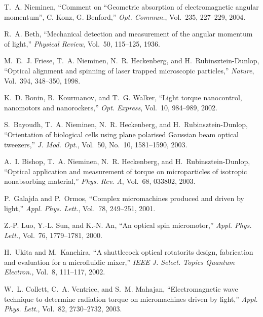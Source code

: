 \documentclass{article}
\begin{document}
\begin{thebibliography}{99}
T.~A. Nieminen, ``Comment on ``{G}eometric absorption of electromagnetic
  angular momentum'', {C}. {K}onz, {G}. {B}enford,'' {\em Opt. Commun.},
  Vol.~235, 227--229, 2004.

R.~A. Beth, ``Mechanical detection and measurement of the angular momentum of
  light,'' {\em Physical Review}, Vol.~50, 115--125, 1936.

M.~E.~J. Friese, T.~A. Nieminen, N.~R. Heckenberg, and H.~Rubinsztein-Dunlop,
  ``Optical alignment and spinning of laser trapped microscopic particles,''
  {\em Nature}, Vol.~394, 348--350, 1998.


K.~D. Bonin, B.~Kourmanov, and T.~G. Walker, ``Light torque nanocontrol,
  nanomotors and nanorockers,'' {\em Opt. Express}, Vol.~10, 984--989,
  2002.

S.~Bayoudh, T.~A. Nieminen, N.~R. Heckenberg, and H.~Rubinsztein-Dunlop,
  ``Orientation of biological cells using plane polarised {G}aussian beam
  optical tweezers,'' {\em J. Mod. Opt.}, Vol.~50, No.~10,
  1581--1590, 2003.

A.~I. Bishop, T.~A. Nieminen, N.~R. Heckenberg, and H.~Rubinsztein-Dunlop,
  ``Optical application and measurement of torque on microparticles of
  isotropic nonabsorbing material,'' {\em Phys. Rev. A}, Vol.~68, 033802,
  2003.

P.~Galajda and P.~Ormos, ``Complex micromachines produced and driven by
  light,'' {\em Appl. Phys. Lett.}, Vol.~78, 249--251, 2001.

Z.-P. Luo, Y.-L. Sun, and K.-N. An, ``An optical spin micromotor,'' {\em
  Appl. Phys. Lett.}, Vol.~76, 1779--1781, 2000.

H.~Ukita and M.~Kanehira, ``A shuttlecock optical rotator\textemdash its
  design, fabrication and evaluation for a microfluidic mixer,'' {\em IEEE J.
  Select. Topics Quantum Electron.}, Vol.~8, 111--117, 2002.

W.~L. Collett, C.~A. Ventrice, and S.~M. Mahajan, ``Electromagnetic wave
  technique to determine radiation torque on micromachines driven by light,''
  {\em Appl. Phys. Lett.}, Vol.~82, 2730--2732, 2003.

\end{thebibliography}
\end{document}
